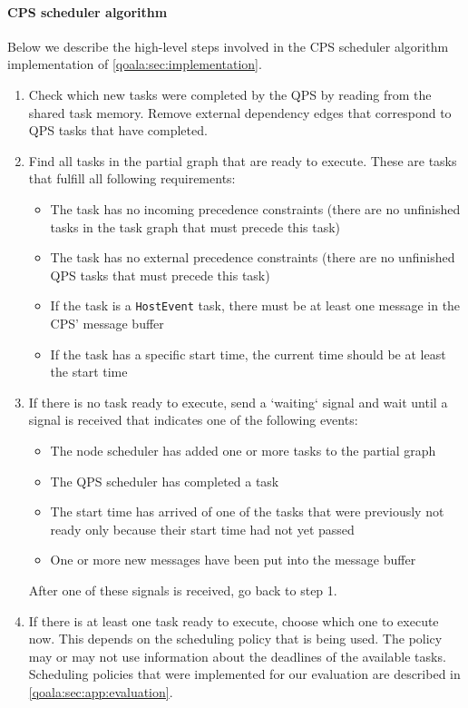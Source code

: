 \paragraph{CPS scheduler algorithm}
Below we describe the high-level steps involved in the CPS scheduler algorithm implementation of \cref{qoala:sec:implementation}.
\begin{enumerate}
    \item Check which new tasks were completed by the QPS by reading from the shared task memory. Remove external dependency edges that correspond to QPS tasks that have completed.
    \item Find all tasks in the partial graph that are ready to execute. These are tasks that fulfill all following requirements:
        \begin{itemize}
            \item The task has no incoming precedence constraints (there are no unfinished tasks in the task graph that must precede this task)
            \item The task has no external precedence constraints (there are no unfinished QPS tasks that must precede this task)
            \item If the task is a \texttt{HostEvent} task, there must be at least one message in the CPS' message buffer
            \item If the task has a specific start time, the current time should be at least the start time
        \end{itemize}
    \item If there is no task ready to execute, send a `waiting` signal and wait until a signal is received that indicates one of the following events:
        \begin{itemize}
            \item The node scheduler has added one or more tasks to the partial graph
            \item The QPS scheduler has completed a task
            \item The start time has arrived of one of the tasks that were previously not ready only because their start time had not yet passed
            \item One or more new messages have been put into the message buffer
        \end{itemize}
        After one of these signals is received, go back to step 1.
    \item If there is at least one task ready to execute, choose which one to execute now. This depends on the scheduling policy that is being used. The policy may or may not use information about the deadlines of the available tasks. Scheduling policies that were implemented for our evaluation are described in \cref{qoala:sec:app:evaluation}.

\end{enumerate}
